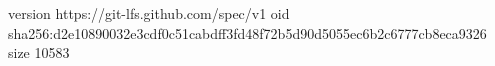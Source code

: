 version https://git-lfs.github.com/spec/v1
oid sha256:d2e10890032e3cdf0c51cabdff3fd48f72b5d90d5055ec6b2c6777cb8eca9326
size 10583
